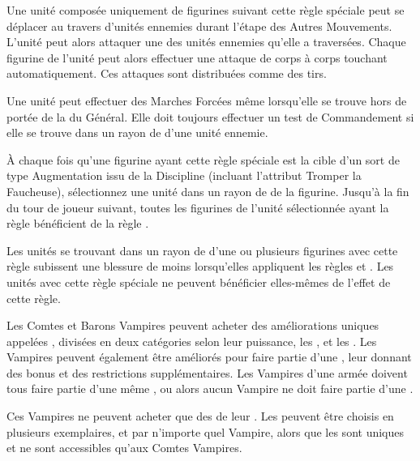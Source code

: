 \armyspecialruleentry{\reaper}

Une unité composée uniquement de figurines suivant cette règle spéciale peut se déplacer au travers d'unités ennemies durant l'étape des Autres Mouvements. L'unité peut alors attaquer une des unités ennemies qu'elle a traversées. Chaque figurine de l'unité peut alors effectuer une attaque de corps à corps touchant automatiquement. Ces attaques sont distribuées comme des tirs.

\armyspecialruleentry{\vampiric}

Une unité \vampiric peut effectuer des Marches Forcées même lorsqu'elle se trouve hors de portée de la \inspiringpresence du Général. Elle doit toujours effectuer un test de Commandement si elle se trouve dans un rayon de  d'une unité ennemie.

\armyspecialruleentry{\supernaturalaura}

À chaque fois qu'une figurine ayant cette règle spéciale est la cible d'un sort de type Augmentation issu de la Discipline \necromancy (incluant l'attribut Tromper la Faucheuse), sélectionnez une unité dans un rayon de  de la figurine. Jusqu'à la fin du tour de joueur suivant, toutes les figurines de l'unité sélectionnée ayant la règle \undead bénéficient de la règle \lightningreflexes .

\armyspecialruleentry{\anticrumbleaura}

Les unités se trouvant dans un rayon de  d'une ou plusieurs figurines avec cette règle subissent une blessure de moins lorsqu'elles appliquent les règles \unstable et \ashestoashes . Les unités avec cette règle spéciale ne peuvent bénéficier elles-mêmes de l'effet de cette règle.



\vspace*{0.3cm}

Les Comtes et Barons Vampires peuvent acheter des améliorations uniques appelées \bloodpowers , divisées en deux catégories selon leur puissance, les \thinbloodpowers, et les \thickbloodpowers. Les Vampires peuvent également être améliorés pour faire partie d'une \bloodline , leur donnant des bonus et des restrictions supplémentaires. Les Vampires d'une armée doivent tous faire partie d'une même \bloodline , ou alors aucun Vampire ne doit faire partie d'une \bloodline . 


Ces Vampires ne peuvent acheter que des \bloodpowers de leur \bloodline . Les \thinbloodpowers peuvent être choisis en plusieurs exemplaires, et par n'importe quel Vampire, alors que les \thickbloodpowers sont uniques et ne sont accessibles qu'aux Comtes Vampires.


